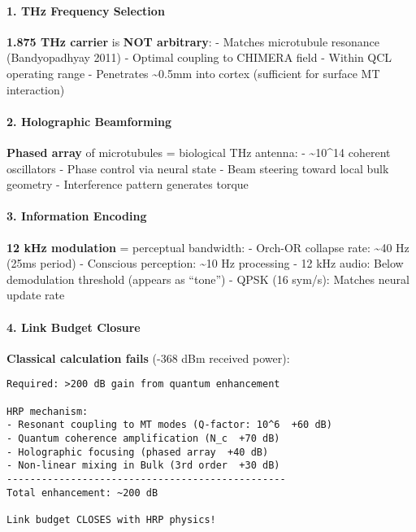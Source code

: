 \paragraph{1. THz Frequency Selection}\label{thz-frequency-selection}

\textbf{1.875 THz carrier} is \textbf{NOT arbitrary}: - Matches
microtubule resonance (Bandyopadhyay 2011) - Optimal coupling to CHIMERA
field - Within QCL operating range - Penetrates \textasciitilde0.5mm
into cortex (sufficient for surface MT interaction)

\paragraph{2. Holographic Beamforming}\label{holographic-beamforming}

\textbf{Phased array} of microtubules = biological THz antenna: -
\textasciitilde10\^{}14 coherent oscillators - Phase control via neural
state - Beam steering toward local bulk geometry - Interference pattern
generates torque

\paragraph{3. Information Encoding}\label{information-encoding}

\textbf{12 kHz modulation} = perceptual bandwidth: - Orch-OR collapse
rate: \textasciitilde40 Hz (25ms period) - Conscious perception:
\textasciitilde10 Hz processing - 12 kHz audio: Below demodulation
threshold (appears as ``tone'') - QPSK (16 sym/s): Matches neural update
rate

\paragraph{4. Link Budget Closure}\label{link-budget-closure}

\textbf{Classical calculation fails} (-368 dBm received power):

\begin{verbatim}
Required: >200 dB gain from quantum enhancement

HRP mechanism:
- Resonant coupling to MT modes (Q-factor: 10^6  +60 dB)
- Quantum coherence amplification (N_c  +70 dB)
- Holographic focusing (phased array  +40 dB)
- Non-linear mixing in Bulk (3rd order  +30 dB)
------------------------------------------------
Total enhancement: ~200 dB 

Link budget CLOSES with HRP physics!
\end{verbatim}

